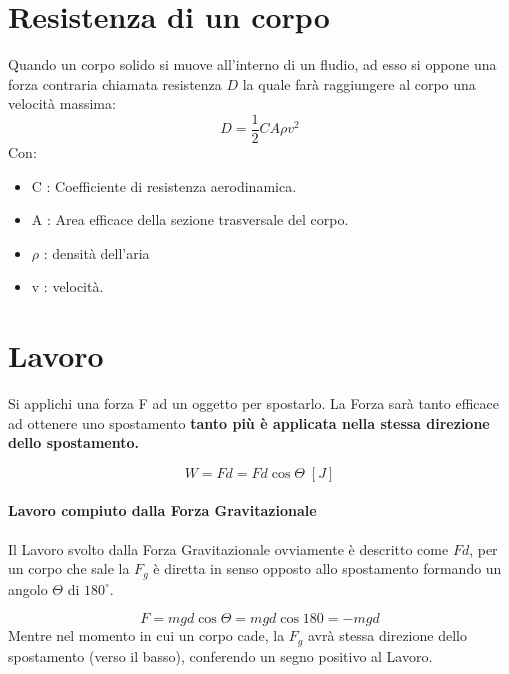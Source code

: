     \section{Resistenza di un corpo} Quando un corpo solido si muove 
    all'interno di un fludio, ad esso si oppone una forza contraria chiamata
    resistenza $D$ la quale farà raggiungere al corpo una velocità massima:
        \begin{equation}
            D = \frac{1}{2}CA\rho v^2
        \end{equation}
        Con:
        \begin{itemize}
            \item C : Coefficiente di resistenza aerodinamica.
            \item A : Area efficace della sezione trasversale del corpo.
            \item $\rho$ : densità dell'aria
            \item v : velocità.
        \end{itemize}

    \section{Lavoro} Si applichi una forza F ad un oggetto per spostarlo. La 
    Forza sarà tanto efficace ad ottenere uno spostamento \textbf{tanto più
    è applicata nella stessa direzione dello spostamento.}

        \begin{equation}
            W = Fd = Fd \cos \Theta \; [J]
        \end{equation}

        \paragraph{Lavoro compiuto dalla Forza Gravitazionale} Il Lavoro svolto 
        dalla Forza Gravitazionale ovviamente è descritto come $F d$, per un 
        corpo che sale la $F_g$ è diretta in senso opposto allo spostamento 
        formando un angolo $\Theta$ di $180^{\circ}$.
        
        \begin{equation}
            F = mgd\cos \Theta = mgd \cos 180 = - mgd
        \end{equation}
        Mentre nel momento in cui un corpo cade, la $F_g$ avrà stessa direzione
        dello spostamento (verso il basso), conferendo un segno positivo al
        Lavoro.
        
